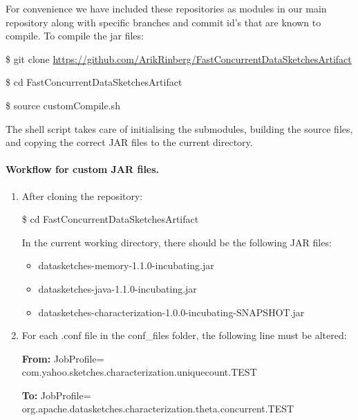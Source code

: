 \documentclass[onecolumn]{sigplanconf}
\begin{document}
{For convenience we have included these repositories as modules in our main repository along with specific branches and commit id's
that are known to compile. To compile the jar files:
\begin{framed}

\$ git clone \url{https://github.com/ArikRinberg/FastConcurrentDataSketchesArtifact}

\$ cd FastConcurrentDataSketchesArtifact

\$ source customCompile.sh

\end{framed}

\noindent The shell script takes care of initialising the submodules, building the source files, and copying the correct
JAR files to the current directory.


\paragraph{\textbf{Workflow for custom JAR files.}}

\begin{enumerate}
  \item After cloning the repository:

  \begin{framed}

  \$ cd FastConcurrentDataSketchesArtifact

  \end{framed}

  \noindent In the current working directory, there should be the following JAR files:

  \begin{itemize}
    \item datasketches-memory-1.1.0-incubating.jar
    \item datasketches-java-1.1.0-incubating.jar
    \item datasketches-characterization-1.0.0-incubating-SNAPSHOT.jar
  \end{itemize}

  \item For each .conf file in the conf\_files folder, the following line must be altered:
  
  \noindent \textbf{From:} JobProfile=\\com.yahoo.sketches.characterization.uniquecount.TEST

  \noindent \textbf{To:} JobProfile= \\ org.apache.datasketches.characterization.theta.concurrent.TEST


\end{enumerate}}
\end{document}
